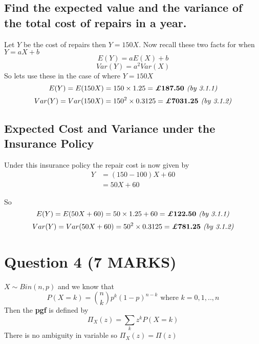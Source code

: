 \documentclass[11pt]{article}
\begin{document}
\subsection{Find the expected value and the variance of the total cost of repairs in a year.}
Let $Y$ be the cost of repairs then $Y=150X$. Now recall these two facts for when $Y = aX+b$
\begin{equation}
     \boxed{E(Y) = aE(X)+b}
\end{equation}
\begin{equation}
     \boxed{Var(Y) = a^{2}Var(X)}
\end{equation}
So lets use these in the case of where $Y=150X$
\begin{equation*}
    E(Y)=E(150X)=150 \times 1.25 =  \bm{\pounds187.50} \text{\emph{ (by 3.1.1)}}
\end{equation*}
\begin{equation*}
    Var(Y)=Var(150X)=150^{2} \times 0.3125 =  \bm{\pounds7031.25} \text{\emph{ (by 3.1.2)}}
\end{equation*}

\subsection{Expected Cost and Variance under the Insurance Policy}
Under this insurance policy the repair cost is now given by
\begin{align*}
    Y &= (150-100)X + 60 \\
      &= 50X + 60
\end{align*}

So
\begin{equation*}
    E(Y)=E(50X+60)=50 \times 1.25 + 60 =  \bm{\pounds122.50} \text{\emph{ (by 3.1.1)}}
\end{equation*}
\begin{equation*}
    Var(Y)=Var(50X+60)=50^{2} \times 0.3125 =  \bm{\pounds781.25} \text{\emph{ (by 3.1.2)}}
\end{equation*}

\section{Question 4 (7 MARKS)}
$X \sim Bin(n,p)$ and we know that
\begin{equation*}
    P(X=k) = \binom{n}{k} p^{k} (1-p)^{n-k} \text{ where } k = 0,1,..,n
\end{equation*}
Then the \textbf{pgf} is defined by %
\begin{equation*}
    \Pi_{X}(z) = \sum_{k} z^{k}P(X=k)
\end{equation*}
There is no ambiguity in variable so $\Pi_{X}(z) = \Pi(z)$
\end{document}
